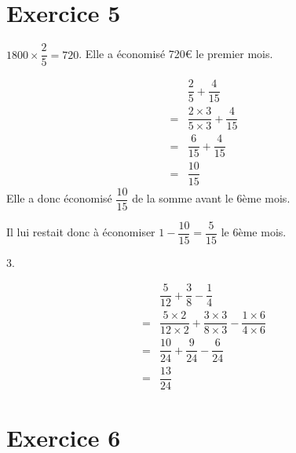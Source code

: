 \section*{Exercice 5}

\begin{enumerate}
    \begin{minipage}{0.45\textwidth}
        \item {}$1800\times\dfrac{2}{5}=720$. Elle a économisé 720€ le premier mois.
        \item {} \begin{align*}
            &\dfrac{2}{5}+\dfrac{4}{15}\\
            =&\dfrac{2\times3}{5\times3}+\dfrac{4}{15}\\
            =&\dfrac{6}{15}+\dfrac{4}{15}\\
            =&\dfrac{10}{15}
        \end{align*}
        Elle a donc économisé $\dfrac{10}{15}$ de la somme avant le 6ème mois. 
    
        Il lui restait donc à économiser $1-\dfrac{10}{15}=\dfrac{5}{15}$ le 6ème mois.
    \end{minipage}
    \hfil\vrule\hfil
    \begin{minipage}{0.45\textwidth}
        3. 
        
        \begin{align*}
            &\dfrac{5}{12}+\dfrac{3}{8}-\dfrac{1}{4}\\
            =&\dfrac{5\times2}{12\times2}+\dfrac{3\times3}{8\times3}-\dfrac{1\times6}{4\times6}\\
            =&\dfrac{10}{24}+\dfrac{9}{24}-\dfrac{6}{24}\\
            =&\dfrac{13}{24}
        \end{align*}
    \end{minipage}
\end{enumerate}

\section*{Exercice 6}

\newcommand{\ax}{1}
\newcommand{\ay}{5}
\newcommand{\bx}{5}
\newcommand{\by}{7}
\newcommand{\cx}{4}
\newcommand{\cy}{1}
\newcommand{\dx}{-5}
\newcommand{\dy}{2}

